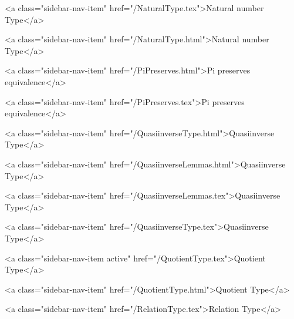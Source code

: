       
        
          <a class="sidebar-nav-item" href="/NaturalType.tex">Natural number Type</a>
        
      
    
      
        
          <a class="sidebar-nav-item" href="/NaturalType.html">Natural number Type</a>
        
      
    
      
        
          <a class="sidebar-nav-item" href="/PiPreserves.html">Pi preserves equivalence</a>
        
      
    
      
        
          <a class="sidebar-nav-item" href="/PiPreserves.tex">Pi preserves equivalence</a>
        
      
    
      
        
          <a class="sidebar-nav-item" href="/QuasiinverseType.html">Quasiinverse Type</a>
        
      
    
      
        
          <a class="sidebar-nav-item" href="/QuasiinverseLemmas.html">Quasiinverse Type</a>
        
      
    
      
        
          <a class="sidebar-nav-item" href="/QuasiinverseLemmas.tex">Quasiinverse Type</a>
        
      
    
      
        
          <a class="sidebar-nav-item" href="/QuasiinverseType.tex">Quasiinverse Type</a>
        
      
    
      
        
          <a class="sidebar-nav-item active" href="/QuotientType.tex">Quotient Type</a>
        
      
    
      
        
          <a class="sidebar-nav-item" href="/QuotientType.html">Quotient Type</a>
        
      
    
      
        
          <a class="sidebar-nav-item" href="/RelationType.tex">Relation Type</a>
        
